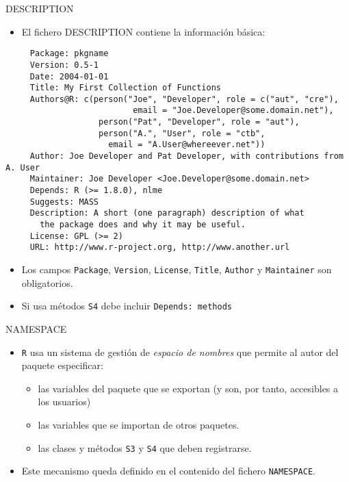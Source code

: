 \documentclass[xcolor={usenames,svgnames,dvipsnames}]{beamer}
\begin{document}
\begin{frame}[fragile,label={sec:org0e240d6}]{DESCRIPTION}
 \begin{itemize}
\item El fichero DESCRIPTION contiene la información básica:
\end{itemize}
\begin{verbatim}
     Package: pkgname
     Version: 0.5-1
     Date: 2004-01-01
     Title: My First Collection of Functions
     Authors@R: c(person("Joe", "Developer", role = c("aut", "cre"),
                          email = "Joe.Developer@some.domain.net"),
                   person("Pat", "Developer", role = "aut"),
                   person("A.", "User", role = "ctb",
     	             email = "A.User@whereever.net"))
     Author: Joe Developer and Pat Developer, with contributions from A. User
     Maintainer: Joe Developer <Joe.Developer@some.domain.net>
     Depends: R (>= 1.8.0), nlme
     Suggests: MASS
     Description: A short (one paragraph) description of what
       the package does and why it may be useful.
     License: GPL (>= 2)
     URL: http://www.r-project.org, http://www.another.url
\end{verbatim}
\begin{itemize}
\item Los campos \texttt{Package}, \texttt{Version}, \texttt{License}, \texttt{Title}, \texttt{Author} y
\texttt{Maintainer} son obligatorios.
\item Si usa métodos \texttt{S4} debe incluir \texttt{Depends: methods}
\end{itemize}
\end{frame}
\begin{frame}[fragile,label={sec:org5d431cd}]{NAMESPACE}
 \begin{itemize}
\item \texttt{R} usa un sistema de gestión de \emph{espacio de nombres} que
permite al autor del paquete especificar:
\begin{itemize}
\item las variables del paquete que se exportan (y son, por tanto,
accesibles a los usuarios)
\item las variables que se importan de otros paquetes.
\item las clases y métodos \texttt{S3} y \texttt{S4} que deben registrarse.
\end{itemize}
\item Este mecanismo queda definido en el contenido del fichero
\texttt{NAMESPACE}.
\end{itemize}
\end{frame}
\end{document}
